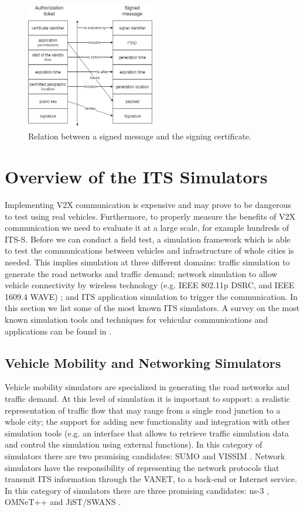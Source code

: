 \begin{figure}
	\centering
	\includegraphics[width=0.5\textwidth]{Figures/relation.png}
	\caption{\label{fig:relation}Relation between a signed message and the signing certificate.}
\end{figure}


\section{Overview of the ITS Simulators}\label{simulators}
Implementing V2X communication is expensive and may prove to be dangerous to test using real vehicles. Furthermore, to properly measure the benefits of V2X communication we need to evaluate it at a large scale, for example hundreds of ITS-S. Before we can conduct a field test, a simulation framework which is able to test the communications between vehicles and infrastructure of whole cities is needed. This implies simulation at three different domains: traffic simulation to generate the road networks and traffic demand; network simulation to allow vehicle connectivity by wireless technology (e.g. IEEE 802.11p
DSRC, and IEEE 1609.4 WAVE) \cite{network_vehicle} \cite{network_vehicle2}; and ITS application simulation to trigger the communication. 
In this section we list some of the most known ITS simulators. A survey on the most known simulation tools and techniques for vehicular communications and applications can be found in \cite{sims}.

\subsection{Vehicle Mobility and Networking Simulators} 
Vehicle mobility simulators are specialized in generating the road networks and traffic demand. At this level of simulation it is important to support: a realistic representation of traffic flow that may range from a single road junction to a whole city; the support for adding new functionality and integration with other simulation tools (e.g. an interface that allows to retrieve traffic simulation data and control the simulation using external functions). In this category of simulators there are two promising candidates: SUMO \cite{SUMO} and VISSIM \cite{vissim}. Network simulators have the responsibility of representing the network protocols that transmit ITS information through the VANET, to a back-end or Internet service. In this category of simulators there are three promising candidates: ns-3 \cite{ns3}, OMNeT++ \cite{omnet} and JiST\slash SWANS \cite{jist}.


